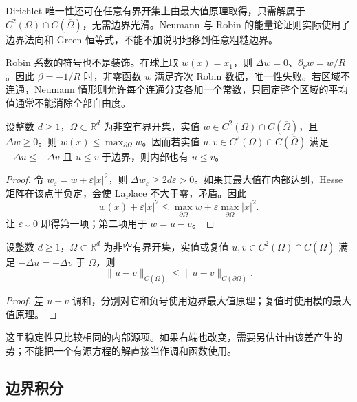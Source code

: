 Dirichlet 唯一性还可在任意有界开集上由最大值原理取得，只需解属于 \(C^2(\Omega)\cap C(\overline\Omega)\)，无需边界光滑。Neumann 与 Robin 的能量论证则实际使用了边界法向和 Green 恒等式，不能不加说明地移到任意粗糙边界。

\ProseParagraphBreak

Robin 系数的符号也不是装饰。在球上取 \(w(x)=x_1\)，则 \(\Delta w=0\)、\(\partial_\nu w=w/R\)。因此 \(\beta=-1/R\) 时，非零函数 \(w\) 满足齐次 Robin 数据，唯一性失败。若区域不连通，Neumann 情形则允许每个连通分支各加一个常数，只固定整个区域的平均值通常不能消除全部自由度。

\begin{proposition}\label{b2:prop:13-subharmonic-comparison}
设整数 \(d\geq1\)，\(\Omega\subset\mathbb R^d\) 为非空有界开集，实值 \(w\in C^2(\Omega)\cap C(\overline\Omega)\)，且 \(\Delta w\geq0\)。则 \(w(x)\leq\max_{\partial\Omega}w\)。因而若实值 \(u,v\in C^2(\Omega)\cap C(\overline\Omega)\) 满足 \(-\Delta u\leq-\Delta v\) 且 \(u\leq v\) 于边界，则内部也有 \(u\leq v\)。
\end{proposition}
\begin{proof}
令 \(w_\varepsilon=w+\varepsilon|x|^2\)，则 \(\Delta w_\varepsilon\geq2d\varepsilon>0\)。如果其最大值在内部达到，Hesse 矩阵在该点半负定，会使 Laplace 不大于零，矛盾。因此
\[
 w(x)+\varepsilon|x|^2
 \leq\max_{\partial\Omega}w+\varepsilon\max_{\partial\Omega}|x|^2.
\]
让 \(\varepsilon\downarrow0\) 即得第一项；第二项用于 \(w=u-v\)。
\end{proof}

\begin{corollary}[边界数据的一致稳定性]\label{b2:cor:13-dirichlet-stability}
设整数 \(d\geq1\)，\(\Omega\subset\mathbb R^d\) 为非空有界开集，实值或复值 \(u,v\in C^2(\Omega)\cap C(\overline\Omega)\) 满足 \(-\Delta u=-\Delta v\) 于 \(\Omega\)，则
\[
 \|u-v\|_{C(\overline\Omega)}\leq\|u-v\|_{C(\partial\Omega)}.
\]
\end{corollary}
\begin{proof}
差 \(u-v\) 调和，分别对它和负号使用边界最大值原理；复值时使用模的最大值原理。
\end{proof}

这里稳定性只比较相同的内部源项。如果右端也改变，需要另估计由该差产生的势；不能把一个有源方程的解直接当作调和函数使用。

\subsection{边界积分}
\label{b2:subsec:130204}

